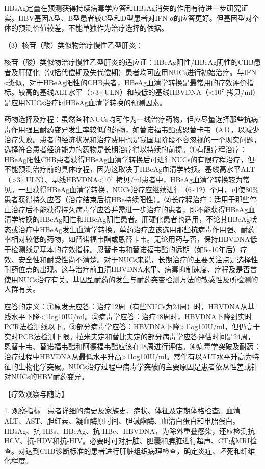 HBsAg定量在预测获得持续病毒学应答和HBsAg消失的作用有待进一步研究证实。HBV基因A型、B型患者较C型和D型患者对IFN-α的应答更好。但基因型对个体的预测价值较差，不能单独作为治疗选择的依据。

（3）核苷（酸）类似物治疗慢性乙型肝炎：

核苷（酸）类似物治疗慢性乙型肝炎的适应证：HBeAg阳性/HBeAg阴性的CHB患者及肝硬化（包括代偿期及失代偿期）患者均可应用NUCs进行初始治疗。与IFN-α类似，对于HBeAg阳性的CHB患者，HBeAg血清学转换是最常用的疗效评价指标。较高的基线ALT水平（\textgreater{}3×ULN）和较低的基线HBVDNA（\textless{}10$^{7}$
拷贝/ml）是应用NUCs治疗时HBeAg血清学转换的预测因素。

药物选择及疗程：虽然各种NUCs均可作为一线治疗药物，但应尽量选择那些抗病毒作用强且耐药变异发生率较低的药物，如替诺福韦酯或恩替卡韦（A1），以减少治疗失败。患者的经济状况和治疗费用也是我国现阶段不容忽视的一个现实问题，选择符合患者经济能力的药物是长期治疗得以持续的前提。①有限疗程治疗：HBeAg阳性CHB患者获得HBeAg血清学转换后可进行NUCs的有限疗程治疗，但不能预测治疗前的具体疗程，因为这取决于HBeAg血清学转换。基线高水平ALT（\textgreater{}3×ULN）、基线HBVDNA\textless{}10$^{7}$
拷贝/ml患者中，HBeAg血清学转换较为常见。一旦获得HBeAg血清学转换，NUCs治疗应继续进行（6\textasciitilde{}12）个月，可使80\%患者获得持久应答（治疗结束后抗HBe持续阳性）。②长疗程治疗：适用于那些停止治疗后不能获得持久病毒学应答并需进一步治疗的患者，即不能获得HBeAg血清学转换的HBeAg阳性和HBeAg阴性患者。肝硬化患者也适用，不论其HBeAg状态或治疗中HBeAg发生血清学转换。单药治疗应该选用那些抗病毒作用强、耐药率相对较低的药物，如替诺福韦酯或恩替卡韦。无论用药与否，保持HBVDNA低于检测线是基本的疗效指标。恩替卡韦和替诺福韦酯的远期（如5\textasciitilde{}10年后）疗效、安全性和耐受性尚不清楚。对于NUCs来说，长期治疗的主要关注点是选择性耐药位点的出现。这与治疗前血清HBVDNA水平、病毒抑制速度、疗程及是否曾使用NUCs治疗有关。基因型耐药的发生与耐药突变检测方法的敏感性及所检测的人群有关。

应答的定义：①原发无应答：治疗12周（有些NUCs为24周）时，HBVDNA从基线水平下降\textless{}1log10IU/ml。②病毒学应答：治疗48周时，HBVDNA下降到实时PCR法检测线以下。③部分病毒学应答：HBVDNA下降\textgreater{}1log10IU/ml，但仍高于实时PCR法检测下限。拉米夫定和替比夫定的部分病毒学应答评估时间是24周，恩替卡韦、替诺福韦酯和阿德福韦酯应该在48周进行评估。④病毒学突破及耐药：治疗过程中HBVDNA从最低水平升高\textgreater{}1log10IU/ml。常伴有以ALT水平升高为特征的生物化学突破。NUCs治疗过程中病毒学突破的主要原因是患者依从性差或针对NUCs的HBV耐药变异。

【疗效观察与随访】

1.
观察指标　患者详细的病史及家族史、症状、体征及定期体格检查。血清ALT、AST、胆红素、凝血酶原时间、胆碱酯酶、血清白蛋白和甲胎蛋白。HBsAg、抗-HBs、HBeAg、抗-HBe、HBVDNA，为除外重叠感染，还应检测抗-HCV、抗-HDV和抗-HIV。必要时可对肝脏、胆囊和脾脏进行超声、CT或MRI检查。对达到CHB诊断标准的患者进行肝脏组织病理检查，确定炎症、坏死和纤维化程度。

